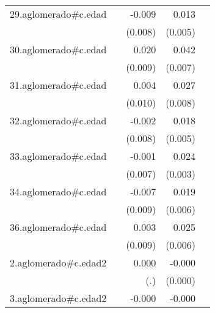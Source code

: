 {\begin{longtable}{l*{4}{D{.}{.}{-1}}}
\addlinespace
29.aglomerado#c.edad&                     &      -0.009         &       0.013\sym{**} &                     \\
            &                     &     (0.008)         &     (0.005)         &                     \\
\addlinespace
30.aglomerado#c.edad&                     &       0.020\sym{*}  &       0.042\sym{***}&                     \\
            &                     &     (0.009)         &     (0.007)         &                     \\
\addlinespace
31.aglomerado#c.edad&                     &       0.004         &       0.027\sym{***}&                     \\
            &                     &     (0.010)         &     (0.008)         &                     \\
\addlinespace
32.aglomerado#c.edad&                     &      -0.002         &       0.018\sym{***}&                     \\
            &                     &     (0.008)         &     (0.005)         &                     \\
\addlinespace
33.aglomerado#c.edad&                     &      -0.001         &       0.024\sym{***}&                     \\
            &                     &     (0.007)         &     (0.003)         &                     \\
\addlinespace
34.aglomerado#c.edad&                     &      -0.007         &       0.019\sym{**} &                     \\
            &                     &     (0.009)         &     (0.006)         &                     \\
\addlinespace
36.aglomerado#c.edad&                     &       0.003         &       0.025\sym{***}&                     \\
            &                     &     (0.009)         &     (0.006)         &                     \\
\addlinespace
2.aglomerado#c.edad2&                     &       0.000         &      -0.000\sym{*}  &                     \\
            &                     &         (.)         &     (0.000)         &                     \\
\addlinespace
3.aglomerado#c.edad2&                     &      -0.000         &      -0.000\sym{***}&                     \\

\end{longtable}}
